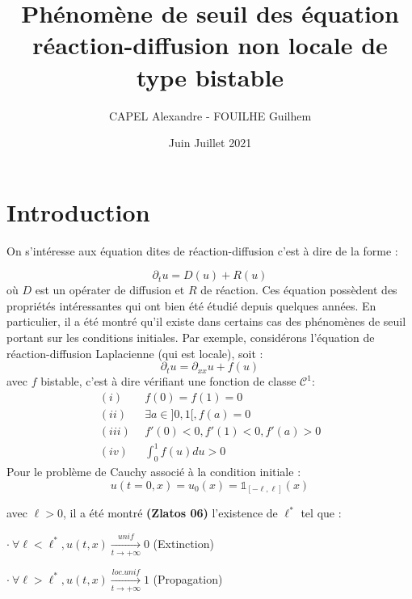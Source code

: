 \documentclass{article}
\title{Phénomène de seuil des équation réaction-diffusion non locale de type bistable}
\author{CAPEL Alexandre - FOUILHE Guilhem}
\date{Juin Juillet 2021}
\begin{document}
\maketitle
\newtheorem{Theoreme}{Théorème}[section]
\newtheorem{Lemme}[Theoreme]{Lemme}




\section{Introduction}
\indent On s'intéresse aux équation dites de réaction-diffusion c'est à dire de la forme : 


\begin{equation}
	\partial _t u = D(u) + R(u)
\end{equation}
où $D$ est un opérater de diffusion et $R$ de réaction.\newline
\indent Ces équation possèdent des propriétés intéressantes qui ont bien été étudié depuis quelques années. En particulier, il a été montré qu'il existe dans certains cas des phénomènes de seuil portant sur les conditions initiales. Par exemple, considérons l'équation de réaction-diffusion Laplacienne (qui est locale), soit : 
\begin{equation}
	\partial_t u = \partial_{xx} u+f(u)
\end{equation}
avec $f$ bistable, c'est à dire vérifiant une fonction de classe $\mathcal{C}^1$: 
\begin{equation*}
\begin{split}
(i)~~&f(0) = f(1) = 0 \\
(ii)~~&\exists a \in ]0,1[, f(a) = 0 \\
(iii)~~&f'(0)<0 , f'(1)<0, f'(a)>0 \\
(iv)~~ &\int_0^1 f(u)du >0
\end{split}
\end{equation*}
Pour le problème de Cauchy associé à la condition initiale : 
\begin{equation}
u(t=0,x) = u_0(x) = \mathds{1}_{[-\ell,\ell]}(x) 
\end{equation}

\noindent avec $\ell >0$, il a été montré \textbf{(Zlatos 06)} l'existence de $\ell^* $ tel que :

$\cdot~ \forall \ell < \ell^* , u(t,x) \underset{t \to +\infty}{\overset{unif}{\longrightarrow}}0$ (Extinction)

$\cdot ~\forall \ell > \ell^* , u(t,x) \underset{t \to +\infty}{\overset{loc. unif}{\longrightarrow}}1$ (Propagation)
\end{document}

